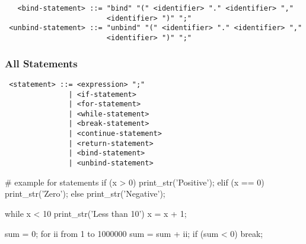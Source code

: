 \begin{verbatim}
   <bind-statement> ::= "bind" "(" <identifier> "." <identifier> ","
                        <identifier> ")" ";"
 <unbind-statement> ::= "unbind" "(" <identifier> "." <identifier> ","
                        <identifier> ")" ";"
\end{verbatim}

\subsubsection{All Statements}

\begin{verbatim}
 <statement> ::= <expression> ";"
               | <if-statement>
               | <for-statement>
               | <while-statement>
               | <break-statement>
               | <continue-statement>
               | <return-statement>
               | <bind-statement>
               | <unbind-statement>
\end{verbatim}

\begin{mylistingn}
# example for statements
if (x > 0)
{
  print_str('Positive');
}
elif (x == 0)
{
  print_str('Zero');
}
else
{
  print_str('Negative');
}

while x < 10
{
  print_str('Less than 10')
  x = x + 1;
}

sum = 0;
for ii from 1 to 1000000
{
  sum = sum + ii;
  if (sum < 0)
  {
    break;
  }
}
\end{mylistingn}


